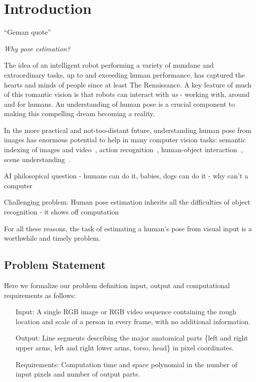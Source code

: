 \chapter{Introduction}

``Geman quote''

{\em Why pose estimation?}

The idea of an intelligent robot performing a variety of mundane and 
extraordinary tasks, up to and exceeding human performance, has captured the 
hearts and minds of people since at least The Renaissance.  A key feature of 
much of this romantic vision is that robots can interact with {\em us} - 
working with, around and for humans.  An understanding of human pose is a 
crucial component to making this compelling dream becoming a reality.  

In the more practical and not-too-distant future, understanding human pose from 
images has enormous potential to help in many computer vision tasks: semantic 
indexing of images and video~\citep{posesearch}, action 
recognition~\citep{pose-action11}, human-object interaction~\citep{bangpeng12}, 
scene understanding~\citep{gupta11}.   

AI philosopical question - humans can do it, babies,  dogs can do it - why 
can't a computer

Challenging problem: Human pose estimation inherits all the difficulties of 
object recognition - it shows off computation

For all these reasons, the task of estimating a human's pose from visual input 
is a worthwhile and timely problem.  



\section{Problem Statement}

Here we formalize our problem definition input, output and computational 
requirements as follows:  

\begin{problem}
\label{prob:pose}
\hspace*{\fill}
\begin{itemize}
 \item[Input:] A single RGB image or RGB video sequence containing the rough 
location and scale of a person in every frame, with no additional information.
\item[Output:] Line segments describing the major anatomical parts \{left and 
right upper arms, left and right lower arms, torso, head\} in pixel 
coordinates.
\item[Requirements:] Computation time and space polynomial in the number of 
input pixels and number of output parts.
\end{itemize}
\end{problem}

